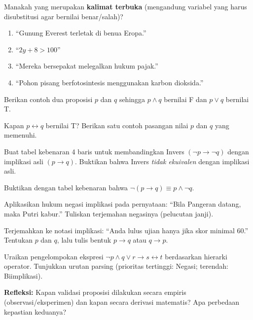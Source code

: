 \documentclass[../main]{subfiles}
\begin{document}
\begin{latihan}
  \item Manakah yang merupakan \textbf{kalimat terbuka} (mengandung variabel yang harus disubstitusi agar bernilai benar/salah)?
    \begin{enumerate}
      \item ``Gunung Everest terletak di benua Eropa.''
      \item ``$2y + 8 > 100$''
      \item ``Mereka bersepakat melegalkan hukum pajak.''
      \item ``Pohon pisang berfotosintesis menggunakan karbon dioksida.''
    \end{enumerate}
  \item Berikan contoh dua proposisi $p$ dan $q$ sehingga $p \wedge q$ bernilai F dan $p \vee q$ bernilai T.
  \item Kapan $p \leftrightarrow q$ bernilai T? Berikan satu contoh pasangan nilai $p$ dan $q$ yang memenuhi.
  \item Buat tabel kebenaran 4 baris untuk membandingkan Invers $(\neg p \rightarrow \neg q)$ dengan implikasi asli $(p \rightarrow q)$. Buktikan bahwa Invers \textit{tidak ekuivalen} dengan implikasi asli.
  \item Buktikan dengan tabel kebenaran bahwa $\neg(p \rightarrow q) \equiv p \wedge \neg q$.
  \item Aplikasikan hukum negasi implikasi pada pernyataan: ``Bila Pangeran datang, maka Putri kabur.'' Tuliskan terjemahan negasinya (pelucutan janji).
  \item Terjemahkan ke notasi implikasi: ``Anda lulus ujian hanya jika skor minimal 60.'' Tentukan $p$ dan $q$, lalu tulis bentuk $p \rightarrow q$ atau $q \rightarrow p$.
  \item Uraikan pengelompokan ekspresi $\neg p \wedge q \vee r \rightarrow s \leftrightarrow t$ berdasarkan hierarki operator. Tunjukkan urutan parsing (prioritas tertinggi: Negasi; terendah: Biimplikasi).
  \item \textbf{Refleksi:} Kapan validasi proposisi dilakukan secara empiris (observasi/eksperimen) dan kapan secara derivasi matematis? Apa perbedaan kepastian keduanya?
\end{latihan}
\end{document}
